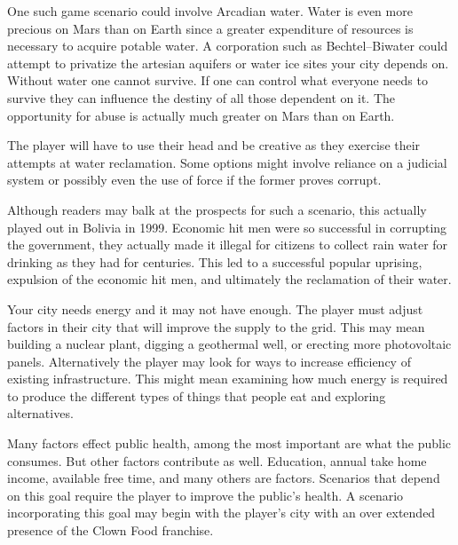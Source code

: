 One such game scenario could involve Arcadian water. Water is even more precious on Mars than on Earth since a greater expenditure of resources is necessary to acquire potable water. A corporation such as Bechtel--Biwater could attempt to privatize the artesian aquifers or water ice sites your city depends on. Without water one cannot survive. If one can control what everyone needs to survive they can influence the destiny of all those dependent on it. The opportunity for abuse is actually much greater on Mars than on Earth.

The player will have to use their head and be creative as they exercise their attempts at water reclamation. Some options might involve reliance on a judicial system or possibly even the use of force if the former proves corrupt.

Although readers may balk at the prospects for such a scenario, this actually played out in Bolivia in 1999. Economic hit men were so successful in corrupting the government, they actually made it illegal for citizens to collect rain water for drinking as they had for centuries. This led to a successful popular uprising, expulsion of the economic hit men, and ultimately the reclamation of their water.


Your city needs energy and it may not have enough. The player must adjust factors in their city that will improve the supply to the grid. This may mean building a nuclear plant, digging a geothermal well, or erecting more photovoltaic panels. Alternatively the player may look for ways to increase efficiency of existing infrastructure. This might mean examining how much energy is required to produce the different types of things that people eat and exploring alternatives.


Many factors effect public health, among the most important are what the public consumes. But other factors contribute as well. Education, annual take home income, available free time, and many others are factors. Scenarios that depend on this goal require the player to improve the public's health. A scenario incorporating this goal may begin with the player's city with an over extended presence of the Clown Food franchise.


